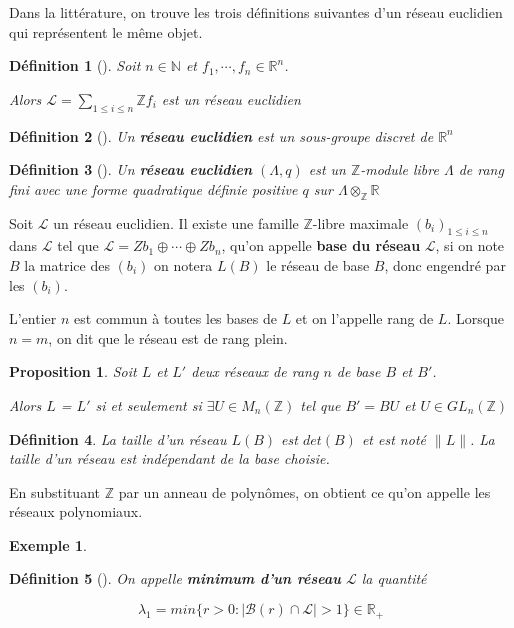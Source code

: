 \documentclass[a4paper,12pt]{report}  %
\theoremstyle{definitionstyle}
\newtheorem{definition}{Définition}[chapter] %
\theoremstyle{examplestyle}
\newtheorem{example}{Exemple}[chapter] %
\theoremstyle{remarkstyle}
\theoremstyle{propositionstyle}
\newtheorem{proposition}{Proposition}[chapter]  %
\theoremstyle{theoremstyle}
\begin{document}
	
	Dans la littérature, on trouve les trois définitions suivantes d’un réseau euclidien qui représentent le même objet.
	
	\begin{definition}[\cite{MCA}]
		Soit $n \in \mathbb{N}$ et $f_1, \cdots, f_n \in \mathbb{R}^n$.
		
		Alors $\mathcal{L} = \sum_{1 \leq i \leq n} \mathbb{Z} f_i
		$ est un réseau euclidien
	\end{definition}

	\begin{definition}[\cite{Wallet}]
		Un \textbf{réseau euclidien} est un sous-groupe discret de $\mathbb{R}^n$
	\end{definition}

	\begin{definition}[\cite{clef_unique_2}]
		Un \textbf{réseau euclidien} $(\Lambda, q)$ est un $\mathbb{Z}$-module libre $\Lambda$ de rang fini avec une forme quadratique définie positive $q$ sur $\Lambda \otimes_\mathbb{Z} \mathbb{R}$ 
	\end{definition}
	
	Soit $\mathcal{L}$ un réseau euclidien. Il existe une famille $\mathbb{Z}$-libre maximale $(b_i)_{1 \leq i \leq n}$ dans $\mathcal{L}$ tel que $\mathcal{L} = Zb_1 \oplus \cdots \oplus Zb_n$, qu'on appelle \textbf{base du réseau} $\mathcal{L}$, si on note $B$ la matrice des $(b_i)$ on notera $L(B)$ le réseau de base $B$, donc engendré par les $(b_i)$.
	
	L'entier $n$ est commun à toutes les bases de $L$ et on l'appelle rang de $L$. Lorsque $n=m$, on dit que le réseau est de rang plein.
	
	\begin{proposition}%
		Soit $L$ et $L'$ deux réseaux de rang $n$ de base $B$ et $B'$.
		
		Alors $L$ = $L'$ si et seulement si $\exists U \in M_n(\mathbb{Z})$ tel que $B'=BU$ et $U \in GL_n(\mathbb{Z})$
	\end{proposition}
	
	\begin{definition}
		La taille d'un réseau $L(B)$ est $det(B)$ et est noté $\|L\|$. La taille d'un réseau est indépendant de la base choisie.
	\end{definition} 
	
	En substituant $\mathbb{Z}$ par un anneau de polynômes, on obtient ce qu'on appelle les réseaux polynomiaux.
	
	\begin{example}
		
	\end{example}
	\begin{definition}[\cite{Wallet}]
		On appelle \textbf{minimum d'un réseau} $\mathcal{L}$ la quantité
		
		$$\lambda_1 = min\{r>0 : |\mathcal{B}(r)\cap\mathcal{L}|>1\} \in \mathbb{R_+}$$
	\end{definition}
	
\end{document}
